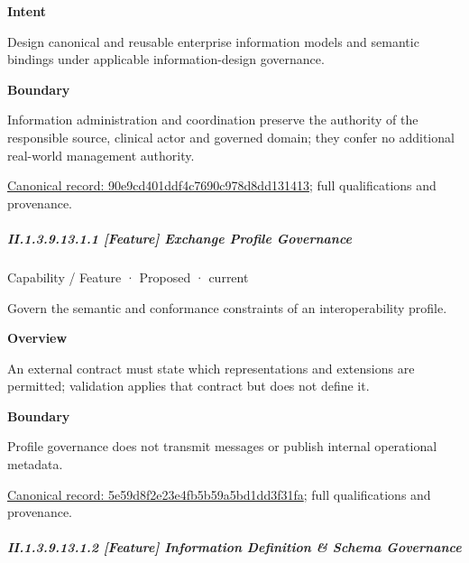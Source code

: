 \textbf{Intent}



Design canonical and reusable enterprise information models and semantic bindings under applicable information-design governance.



\textbf{Boundary}



Information administration and coordination preserve the authority of the responsible source, clinical actor and governed domain; they confer no additional real-world management authority.


{\footnotesize \href{../../../../continuum/strategy/capability/90e9cd401ddf4c7690c978d8dd131413.md}{Canonical record: 90e9cd401ddf4c7690c978d8dd131413}; full qualifications and provenance.}\par
\subparagraph*{II.1.3.9.13.1.1 [Feature] Exchange Profile Governance}
\label{navigation:II.1.3.9.13.1.1}

\label{element:5e59d8f2e23e4fb5b59a5bd1dd3f31fa}
{\small Capability / Feature · Proposed · current}\par

Govern the semantic and conformance constraints of an interoperability profile.



\textbf{Overview}



An external contract must state which representations and extensions are permitted; validation applies that contract but does not define it.



\textbf{Boundary}



Profile governance does not transmit messages or publish internal operational metadata.


{\footnotesize \href{../../../../continuum/strategy/capability/feature/5e59d8f2e23e4fb5b59a5bd1dd3f31fa.md}{Canonical record: 5e59d8f2e23e4fb5b59a5bd1dd3f31fa}; full qualifications and provenance.}\par
\subparagraph*{II.1.3.9.13.1.2 [Feature] Information Definition \& Schema Governance}
\label{navigation:II.1.3.9.13.1.2}


